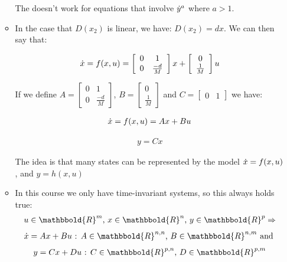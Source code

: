 \begin{enumerate}
\begin{itemize}
                The \Lap \text{ } doesn't work for equations that involve $\dot{y} ^ a$ where $a > 1$.

            \item In the case that $D(x_2)$ is linear, we have: $D(x_2) = dx$. We can then say that:

                \begin{align*} \dot{x} = f(x, u) = \left[ \begin{array}{cc} 0 & 1 \\ 0 & \frac{-d}{M} \end{array} \right] x + \left[ \begin{array}{c} 0 \\ \frac{1}{M} \end{array} \right] u \end{align*}

                If we define $A = \left[ \begin{array}{cc} 0 & 1 \\ 0 & \frac{-d}{M} \end{array} \right]$, $B = \left[ \begin{array}{c} 0 \\ \frac{1}{M} \end{array} \right]$ and $C = \left[ \begin{array}{cc} 0 & 1 \end{array} \right]$ we have:

                \begin{align*} \dot{x} = f(x, u) = A x + B u \end{align*}

                \begin{align*} y = C x \end{align*}

                The idea is that many states can be represented by the model $\dot{x} = f(x, u)$, and $y = h(x, u)$

            \item In this course we only have time-invariant systems, so this always holds true:
                \begin{align*} u \in \mathbbold{R}^m \text{, } x \in \mathbbold{R}^n \text{, } y \in \mathbbold{R}^p \Rightarrow \end{align*}
                \begin{align*} \dx = Ax + Bu \text{ : }  A \in \mathbbold{R}^{n,n} \text{, } B \in \mathbbold{R}^{n,m} \text{ and }\end{align*}
                \begin{align*} y = Cx + Du \text{ : }  C \in \mathbbold{R}^{p,n} \text{, } D \in \mathbbold{R}^{p,m} \end{align*}


\end{itemize}
\end{enumerate}
